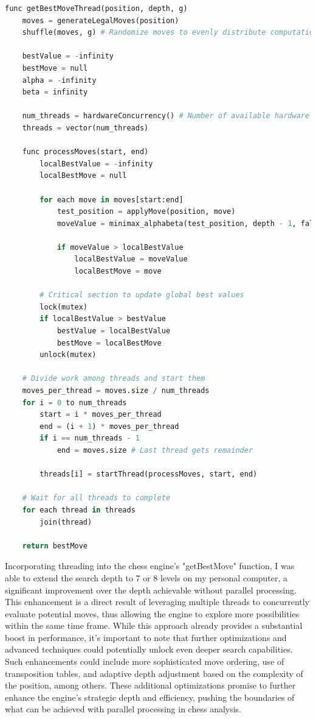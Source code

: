 \documentclass{article}
\begin{document}
\begin{lstlisting}[language=Python, caption=Alpha-Beta Pruning Enhancements]
func getBestMoveThread(position, depth, g)
    moves = generateLegalMoves(position)
    shuffle(moves, g) # Randomize moves to evenly distribute computational load

    bestValue = -infinity
    bestMove = null
    alpha = -infinity
    beta = infinity

    num_threads = hardwareConcurrency() # Number of available hardware threads
    threads = vector(num_threads)

    func processMoves(start, end)
        localBestValue = -infinity
        localBestMove = null

        for each move in moves[start:end]
            test_position = applyMove(position, move)
            moveValue = minimax_alphabeta(test_position, depth - 1, false, alpha, beta)

            if moveValue > localBestValue
                localBestValue = moveValue
                localBestMove = move

        # Critical section to update global best values
        lock(mutex)
        if localBestValue > bestValue
            bestValue = localBestValue
            bestMove = localBestMove
        unlock(mutex)

    # Divide work among threads and start them
    moves_per_thread = moves.size / num_threads
    for i = 0 to num_threads
        start = i * moves_per_thread
        end = (i + 1) * moves_per_thread
        if i == num_threads - 1
            end = moves.size # Last thread gets remainder

        threads[i] = startThread(processMoves, start, end)

    # Wait for all threads to complete
    for each thread in threads
        join(thread)

    return bestMove
\end{lstlisting}

Incorporating threading into the chess engine's "getBestMove" function, I was able to extend the search depth to 7 or 8 levels on my personal computer, a significant improvement over the depth achievable without parallel processing. This enhancement is a direct result of leveraging multiple threads to concurrently evaluate potential moves, thus allowing the engine to explore more possibilities within the same time frame. While this approach already provides a substantial boost in performance, it's important to note that further optimizations and advanced techniques could potentially unlock even deeper search capabilities. Such enhancements could include more sophisticated move ordering, use of transposition tables, and adaptive depth adjustment based on the complexity of the position, among others. These additional optimizations promise to further enhance the engine's strategic depth and efficiency, pushing the boundaries of what can be achieved with parallel processing in chess analysis.
\end{document}
